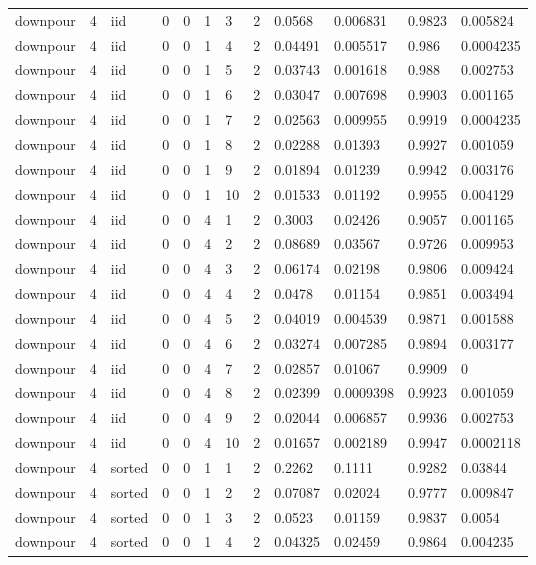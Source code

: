 \begin{tabular}{llllllllllll}
downpour & 4 & iid & 0 & 0 & 1 & 3 & 2 & 0.0568 & 0.006831 & 0.9823 & 0.005824 \\
downpour & 4 & iid & 0 & 0 & 1 & 4 & 2 & 0.04491 & 0.005517 & 0.986 & 0.0004235 \\
downpour & 4 & iid & 0 & 0 & 1 & 5 & 2 & 0.03743 & 0.001618 & 0.988 & 0.002753 \\
downpour & 4 & iid & 0 & 0 & 1 & 6 & 2 & 0.03047 & 0.007698 & 0.9903 & 0.001165 \\
downpour & 4 & iid & 0 & 0 & 1 & 7 & 2 & 0.02563 & 0.009955 & 0.9919 & 0.0004235 \\
downpour & 4 & iid & 0 & 0 & 1 & 8 & 2 & 0.02288 & 0.01393 & 0.9927 & 0.001059 \\
downpour & 4 & iid & 0 & 0 & 1 & 9 & 2 & 0.01894 & 0.01239 & 0.9942 & 0.003176 \\
downpour & 4 & iid & 0 & 0 & 1 & 10 & 2 & 0.01533 & 0.01192 & 0.9955 & 0.004129 \\
downpour & 4 & iid & 0 & 0 & 4 & 1 & 2 & 0.3003 & 0.02426 & 0.9057 & 0.001165 \\
downpour & 4 & iid & 0 & 0 & 4 & 2 & 2 & 0.08689 & 0.03567 & 0.9726 & 0.009953 \\
downpour & 4 & iid & 0 & 0 & 4 & 3 & 2 & 0.06174 & 0.02198 & 0.9806 & 0.009424 \\
downpour & 4 & iid & 0 & 0 & 4 & 4 & 2 & 0.0478 & 0.01154 & 0.9851 & 0.003494 \\
downpour & 4 & iid & 0 & 0 & 4 & 5 & 2 & 0.04019 & 0.004539 & 0.9871 & 0.001588 \\
downpour & 4 & iid & 0 & 0 & 4 & 6 & 2 & 0.03274 & 0.007285 & 0.9894 & 0.003177 \\
downpour & 4 & iid & 0 & 0 & 4 & 7 & 2 & 0.02857 & 0.01067 & 0.9909 & 0 \\
downpour & 4 & iid & 0 & 0 & 4 & 8 & 2 & 0.02399 & 0.0009398 & 0.9923 & 0.001059 \\
downpour & 4 & iid & 0 & 0 & 4 & 9 & 2 & 0.02044 & 0.006857 & 0.9936 & 0.002753 \\
downpour & 4 & iid & 0 & 0 & 4 & 10 & 2 & 0.01657 & 0.002189 & 0.9947 & 0.0002118 \\
downpour & 4 & sorted & 0 & 0 & 1 & 1 & 2 & 0.2262 & 0.1111 & 0.9282 & 0.03844 \\
downpour & 4 & sorted & 0 & 0 & 1 & 2 & 2 & 0.07087 & 0.02024 & 0.9777 & 0.009847 \\
downpour & 4 & sorted & 0 & 0 & 1 & 3 & 2 & 0.0523 & 0.01159 & 0.9837 & 0.0054 \\
downpour & 4 & sorted & 0 & 0 & 1 & 4 & 2 & 0.04325 & 0.02459 & 0.9864 & 0.004235 \\

\end{tabular}
